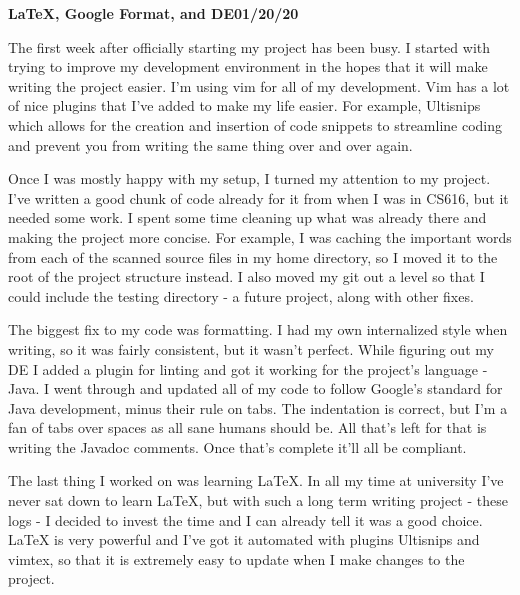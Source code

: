 \documentclass[]{article}
\newenvironment{logentry}[2]%
{\noindent\vspace{.2cm}\large\textbf{#2}\titlerule\large\textbf{#1}}
{\\\\\\}
\begin{document}
\begin{logentry}{01/20/20}{{\LaTeX}, Google Format, and DE}
    \par The first week after officially starting my project has been busy.
    I started with trying to improve my development environment in the 
    hopes that it will make writing the project easier.  I'm using vim
    for all of my development.  Vim has a lot of nice plugins that I've 
    added to make my life easier.  For example, Ultisnips which allows
    for the creation and insertion of code snippets to streamline
    coding and prevent you from writing the same thing over and
    over again.
    \par Once I was mostly happy with my setup, I turned my attention
    to my project.  I've written a good chunk of code already for it
    from when I was in CS616, but it needed some work.  I spent some
    time cleaning up what was already there and making the project more
    concise.  For example, I was caching the important words from each of 
    the scanned source files in my home directory, so I moved it to the root
    of the project structure instead.  I also moved my git out a level so that
    I could include the testing directory - a future project, along with other
    fixes.
    \par The biggest fix to my code was formatting.  I had my own internalized 
    style when writing, so it was fairly consistent, but it wasn't perfect.
    While figuring out my DE I added a plugin for linting and got it working
    for the project's language - Java.  I went through and updated all of my
    code to follow Google's standard for Java development, minus their rule
    on tabs.  The indentation is correct, but I'm a fan of tabs over spaces 
    as all sane humans should be.  All that's left for that is writing the
    Javadoc comments.  Once that's complete it'll all be compliant.
    \par The last thing I worked on was learning {\LaTeX}. In all my
    time at university I've never sat down to learn {\LaTeX}, but with
    such a long term writing project - these logs - I decided
    to invest the time and I can already tell it was a good choice.
    {\LaTeX} is very powerful and I've got it automated with plugins 
    Ultisnips and vimtex, so that it is extremely easy to update when I make 
    changes to the project.
\end{logentry}
\end{document}
